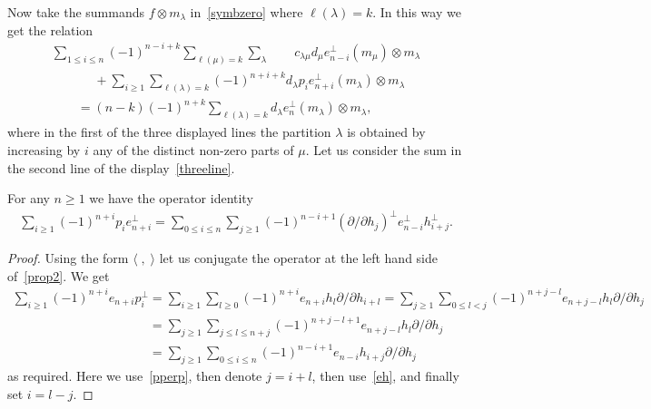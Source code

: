 \documentclass[pdftex]{sigma}
\numberwithin{equation}{section}
\renewcommand\ge{\geqslant}
\renewcommand\le{\leqslant}
\begin{document}
Now take the summands $f\otimes m_\lambda$ in~\eqref{symbzero} where $\ell(\lambda)=k$.
In this way we get the relation
\begin{gather}
\sum_{1\le i\le n}(-1)^{n-i+k}\sum_{\ell(\mu)=k}\sum_\lambda
\qquad
c_{\lambda\mu}d_\mu e_{n-i}^{\perp}(m_\mu)\otimes m_\lambda
\nonumber
\\
\qquad\phantom{=}
{}+\sum_{i\ge1}\sum_{\ell(\lambda)=k}(-1)^{n+i+k}d_\lambda
p_ie_{n+i}^{\perp}(m_\lambda)\otimes m_\lambda
\nonumber
\\
\qquad{}
=(n-k)(-1)^{n+k}\sum_{\ell(\lambda)=k}d_\lambda e_n^{\perp}(m_\lambda)\otimes m_\lambda,
\label{threeline}
\end{gather}
where in the f\/irst of the three displayed lines the partition $\lambda$ is obtained by increasing by $i$
any of the distinct non-zero parts of $\mu$.
Let us consider the sum in the second line of the display~\eqref{threeline}.
\begin{proposition}\label{Prop2}
For any $n\ge1$ we have the operator identity
\begin{gather}
\label{prop2}
\sum_{i\ge1}(-1)^{n+i}p_ie_{n+i}^{\perp}
=\sum_{0\le i\le n}\sum_{j\ge1}(-1)^{n-i+1}(
\partial /\partial h_j)^{\perp}e_{n-i}
^{\perp}h_{i+j}^{\perp}.
\end{gather}
\end{proposition}
\begin{proof}
Using the form $\langle\;,\;\rangle$ let us conjugate the operator at the left hand side of~\eqref{prop2}.
We get
\begin{gather*}
\sum_{i\ge1}(-1)^{n+i}e_{n+i}p_i^{\perp}
=\sum_{i\ge1}\sum_{l\ge0}(-1)^{n+i}e_{n+i}h_{l}\partial /\partial h_{i+l}
=\sum_{j\ge1}\sum_{0\le l<j}(-1)^{n+j-l}e_{n+j-l}h_{l}\partial /\partial h_{j}
\\
\phantom{\sum_{i\ge1}(-1)^{n+i}e_{n+i}p_i^{\perp}}
=\sum_{j\ge1}\sum_{j\le l\le n+j}(-1)^{n+j-l+1}e_{n+j-l}h_{l}\partial /\partial h_{j}
\\
\phantom{\sum_{i\ge1}(-1)^{n+i}e_{n+i}p_i^{\perp}}
=\sum_{j\ge1}\sum_{0\le i\le n}(-1)^{n-i+1}e_{n-i}h_{i+j}\partial /\partial h_{j}
\end{gather*}
as required.
Here we use~\eqref{pperp}, then denote $j=i+l$, then use~\eqref{eh}, and f\/inally set
$i=l-j$.
\end{proof}
\end{document}
